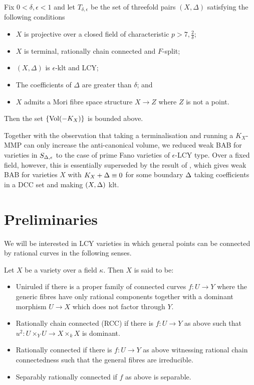 \begin{theorem}\label{Main_Bound2}
	Fix $0 < \delta, \epsilon <1$ and let $T_{\delta,\epsilon}$ be the set of threefold pairs $(X,\Delta)$ satisfying the following conditions
	\begin{itemize}
		\item $X$ is projective over a closed field of characteristic $p >7,\frac{2}{\delta}$;
		\item $X$ is terminal, rationally chain connected and $F$-split;
		\item $(X,\Delta)$ is $\epsilon$-klt and LCY;
		\item The coefficients of $\Delta$ are greater than $\delta$; and
		\item $X$ admits a Mori fibre space structure $X \to Z$ where $Z$ is not a point.
	\end{itemize}
	Then the set $\{\text{Vol}(-K_{X})\}$ is bounded above. 
\end{theorem}
\begin{remark}
	Together with the observation that taking a terminalisation and running a $K_{X}$-MMP can only increase the anti-canonical volume, we reduced weak BAB for varieties in $S_{\Delta,\epsilon}$ to the case of prime Fano varieties of $\epsilon$-LCY type. Over a fixed field, however, this is essentially superseded by the result of \cite{das2018boundedness}, which gives weak BAB for varieties $X$ with $K_{X}+\Delta \equiv 0$ for some boundary $\Delta$ taking coefficients in a DCC set and making $(X,\Delta)$ klt. 
\end{remark}

\section{Preliminaries}

We will be interested in LCY varieties in which general points can be connected by rational curves in the following senses.

\begin{definition}
	Let $X$ be a variety over a field $\kappa$. Then $X$ is said to be:
	\begin{itemize}
		\item Uniruled if there is a proper family of connected curves $f\colon U \to Y$ where the generic fibres have only rational components together with a dominant morphism $U \to X$ which does not factor through $Y$.
		\item Rationally chain connected (RCC) if there is $f\colon U \to Y$ as above such that $u^{2}\colon U \times_{Y} U \to X \times_{k} X$ is dominant.
		\item Rationally connected if there is $f\colon U \to Y$ as above witnessing rational chain connectedness such that the general fibres are irreducible.
		\item Separably rationally connected if $f$ as above is separable.
	\end{itemize}
\end{definition}

